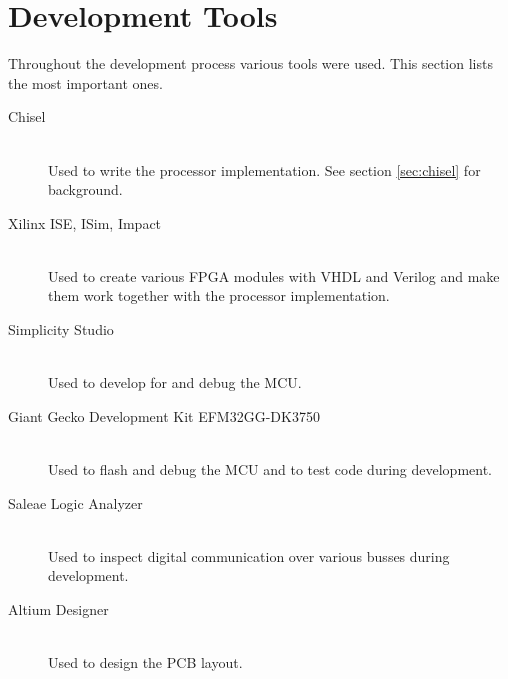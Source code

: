 \section{Development Tools}
Throughout the development process various tools were used.
This section lists the most important ones.

\begin{description}
    \item[Chisel]
    \hfill\\
    Used to write the processor implementation.
    See section \ref{sec:chisel} for background.
    \item[Xilinx ISE, ISim, Impact]
    \hfill\\
    Used to create various FPGA modules with VHDL and Verilog and make them work together with the processor implementation.
    \item[Simplicity Studio]
    \hfill\\
    Used to develop for and debug the MCU.
    \item[Giant Gecko Development Kit EFM32GG-DK3750]
    \hfill\\
    Used to flash and debug the MCU and to test code during development.
    \item[Saleae Logic Analyzer]
    \hfill\\
    Used to inspect digital communication over various busses during development.
    \item[Altium Designer]
    \hfill\\
    Used to design the PCB layout.
\end{description}


